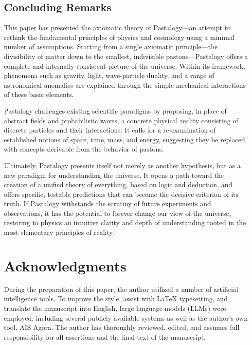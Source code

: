 \documentclass[pdflatex,sn-mathphys-num]{sn-jnl}
\begin{document}
\subsection{Concluding Remarks}\label{subsec:conclusion}

This paper has presented the axiomatic theory of Pastalogy---an attempt to rethink the fundamental principles of physics and cosmology using a minimal number of assumptions. Starting from a single axiomatic principle---the divisibility of matter down to the smallest, indivisible pastons---Pastalogy offers a complete and internally consistent picture of the universe. Within its framework, phenomena such as gravity, light, wave-particle duality, and a range of astronomical anomalies are explained through the simple mechanical interactions of these basic elements.

Pastalogy challenges existing scientific paradigms by proposing, in place of abstract fields and probabilistic waves, a concrete physical reality consisting of discrete particles and their interactions. It calls for a re-examination of established notions of space, time, mass, and energy, suggesting they be replaced with concepts derivable from the behavior of pastons.

Ultimately, Pastalogy presents itself not merely as another hypothesis, but as a new paradigm for understanding the universe. It opens a path toward the creation of a unified theory of everything, based on logic and deduction, and offers specific, testable predictions that can become the decisive criterion of its truth. If Pastalogy withstands the scrutiny of future experiments and observations, it has the potential to forever change our view of the universe, restoring to physics an intuitive clarity and depth of understanding rooted in the most elementary principles of reality.

\backmatter

\section*{Acknowledgments}\label{sec:acknowledgements}

During the preparation of this paper, the author utilized a number of artificial intelligence tools. To improve the style, assist with LaTeX typesetting, and translate the manuscript into English, large language models (LLMs) were employed, including several publicly available systems as well as the author's own tool, AIS Agora. The author has thoroughly reviewed, edited, and assumes full responsibility for all assertions and the final text of the manuscript.
\end{document}
